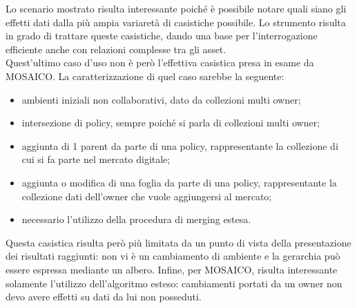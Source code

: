 \documentclass[12pt,a4paper,twoside]{book}
\begin{document}
Lo scenario mostrato risulta interessante poiché è possibile notare quali siano gli effetti dati dalla più ampia variaretà di casistiche possibile. Lo strumento risulta in grado di trattare queste casistiche, dando una base per l'interrogazione efficiente anche con relazioni complesse tra gli asset. \\
Quest'ultimo caso d'uso non è però l'effettiva casistica presa in esame da MOSAICO. La caratterizzazione di quel caso sarebbe la seguente:
\begin{itemize}
\item ambienti iniziali non collaborativi, dato da collezioni multi owner;
\item intersezione di policy, sempre poiché si parla di collezioni multi owner;
\item aggiunta di 1 parent da parte di una policy, rappresentante la collezione di cui si fa parte nel mercato digitale;
\item aggiunta o modifica di una foglia da parte di una policy, rappresentante la collezione dati dell'owner che vuole aggiungersi al mercato;
\item necessario l'utilizzo della procedura di merging estesa.
\end{itemize}
Questa casistica risulta però più limitata da un punto di vista della presentazione dei risultati raggiunti: non vi è un cambiamento di ambiente e la gerarchia può essere espressa mediante un albero. Infine, per MOSAICO, risulta interessante solamente l'utilizzo dell'algoritmo esteso: cambiamenti portati da un owner non devo avere effetti su dati da lui non posseduti.
\end{document}
